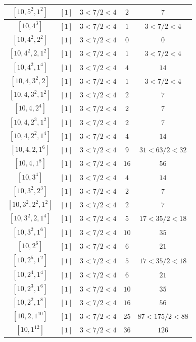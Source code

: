 \documentclass{article}%
\begin{document}
\begin{center}
\begin{longtable}{||c|c|c|c|c||}
$[10, 5^{2}, 1^{2}]$ & $[1]$ & $3 < 7/2 < 4$ & $2$ & $7$ \\ \hline 
$[10, 4^{3}]$ & $[1]$ & $3 < 7/2 < 4$ & $1$ & $3 < 7/2 < 4$ \\ \hline 
$[10, 4^{2}, 2^{2}]$ & $[1]$ & $3 < 7/2 < 4$ & $0$ & $0$ \\ \hline 
$[10, 4^{2}, 2, 1^{2}]$ & $[1]$ & $3 < 7/2 < 4$ & $1$ & $3 < 7/2 < 4$ \\ \hline 
$[10, 4^{2}, 1^{4}]$ & $[1]$ & $3 < 7/2 < 4$ & $4$ & $14$ \\ \hline 
$[10, 4, 3^{2}, 2]$ & $[1]$ & $3 < 7/2 < 4$ & $1$ & $3 < 7/2 < 4$ \\ \hline 
$[10, 4, 3^{2}, 1^{2}]$ & $[1]$ & $3 < 7/2 < 4$ & $2$ & $7$ \\ \hline 
$[10, 4, 2^{4}]$ & $[1]$ & $3 < 7/2 < 4$ & $2$ & $7$ \\ \hline 
$[10, 4, 2^{3}, 1^{2}]$ & $[1]$ & $3 < 7/2 < 4$ & $2$ & $7$ \\ \hline 
$[10, 4, 2^{2}, 1^{4}]$ & $[1]$ & $3 < 7/2 < 4$ & $4$ & $14$ \\ \hline 
$[10, 4, 2, 1^{6}]$ & $[1]$ & $3 < 7/2 < 4$ & $9$ & $31 < 63/2 < 32$ \\ \hline 
$[10, 4, 1^{8}]$ & $[1]$ & $3 < 7/2 < 4$ & $16$ & $56$ \\ \hline 
$[10, 3^{4}]$ & $[1]$ & $3 < 7/2 < 4$ & $4$ & $14$ \\ \hline 
$[10, 3^{2}, 2^{3}]$ & $[1]$ & $3 < 7/2 < 4$ & $2$ & $7$ \\ \hline 
$[10, 3^{2}, 2^{2}, 1^{2}]$ & $[1]$ & $3 < 7/2 < 4$ & $2$ & $7$ \\ \hline 
$[10, 3^{2}, 2, 1^{4}]$ & $[1]$ & $3 < 7/2 < 4$ & $5$ & $17 < 35/2 < 18$ \\ \hline 
$[10, 3^{2}, 1^{6}]$ & $[1]$ & $3 < 7/2 < 4$ & $10$ & $35$ \\ \hline 
$[10, 2^{6}]$ & $[1]$ & $3 < 7/2 < 4$ & $6$ & $21$ \\ \hline 
$[10, 2^{5}, 1^{2}]$ & $[1]$ & $3 < 7/2 < 4$ & $5$ & $17 < 35/2 < 18$ \\ \hline 
$[10, 2^{4}, 1^{4}]$ & $[1]$ & $3 < 7/2 < 4$ & $6$ & $21$ \\ \hline 
$[10, 2^{3}, 1^{6}]$ & $[1]$ & $3 < 7/2 < 4$ & $10$ & $35$ \\ \hline 
$[10, 2^{2}, 1^{8}]$ & $[1]$ & $3 < 7/2 < 4$ & $16$ & $56$ \\ \hline 
$[10, 2, 1^{10}]$ & $[1]$ & $3 < 7/2 < 4$ & $25$ & $87 < 175/2 < 88$ \\ \hline 
$[10, 1^{12}]$ & $[1]$ & $3 < 7/2 < 4$ & $36$ & $126$ \\ \hline 

\end{longtable}
\end{center}
\end{document}

